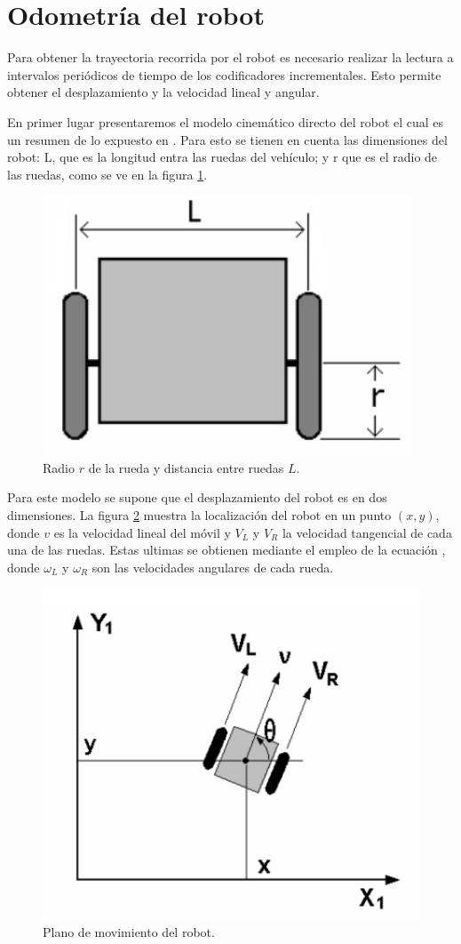 \section{Odometría del robot}

Para obtener la trayectoria recorrida por el robot es necesario realizar la lectura a intervalos periódicos de tiempo de los codificadores incrementales. Esto permite obtener el desplazamiento y la velocidad lineal y angular. 

En primer lugar presentaremos el modelo cinemático directo del robot el cual es un resumen de lo expuesto en \cite{cinematicaDirecta}. Para esto se tienen en cuenta las dimensiones del robot: L, que es la longitud entra las ruedas del vehículo; y r que es el radio de las ruedas, como se ve en la figura \ref{imagen:RobotRL}.





\begin{figure}[H]
	\centering
	\includegraphics[width=0.5\linewidth]{imagenes/prototipo/RobotRL}
	\caption[Odometría del robot]{Radio $r$ de la rueda y distancia entre ruedas $L$.}
	\label{imagen:RobotRL}
\end{figure}

Para este modelo se supone que el desplazamiento del robot es en dos dimensiones. La figura \ref{imagen:RobotPlano} muestra la localización del robot en un punto $(x, y) $, donde $v$ es la velocidad lineal del móvil y ${ V }_{ L}$ y ${ V }_{ R}$ la velocidad tangencial de cada una de las ruedas. Estas ultimas se obtienen mediante el empleo de la ecuación , donde ${ \omega }_{ L}$ y ${ \omega}_{ R}$  son las velocidades angulares de cada rueda. 

\begin{figure}[H]
	\centering
	\includegraphics[width=0.5\linewidth]{imagenes/prototipo/RobotPlano}
	\caption[Plano de movimiento del robot]{Plano de movimiento del robot.}
	\label{imagen:RobotPlano}
\end{figure}

